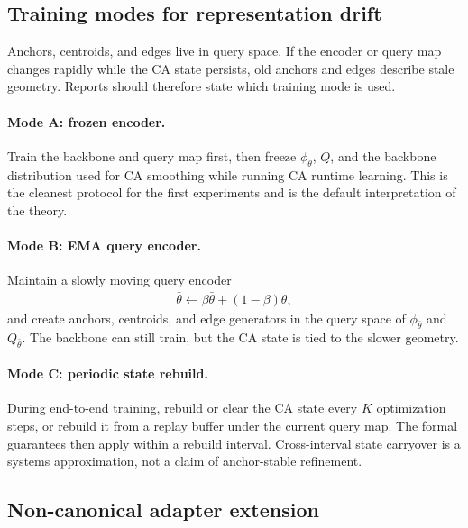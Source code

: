 \subsection{Training modes for representation drift}

Anchors, centroids, and edges live in query space. If the encoder or query map changes rapidly while the CA state persists, old anchors and edges describe stale geometry. Reports should therefore state which training mode is used.

\paragraph{Mode A: frozen encoder.}
Train the backbone and query map first, then freeze $\phi_\theta$, $Q$, and the backbone distribution used for CA smoothing while running CA runtime learning. This is the cleanest protocol for the first experiments and is the default interpretation of the theory.

\paragraph{Mode B: EMA query encoder.}
Maintain a slowly moving query encoder
\begin{align*}
\bar\theta\leftarrow \beta\bar\theta+(1-\beta)\theta,
\end{align*}
and create anchors, centroids, and edge generators in the query space of $\phi_{\bar\theta}$ and $Q_{\bar\theta}$. The backbone can still train, but the CA state is tied to the slower geometry.

\paragraph{Mode C: periodic state rebuild.}
During end-to-end training, rebuild or clear the CA state every $K$ optimization steps, or rebuild it from a replay buffer under the current query map. The formal guarantees then apply within a rebuild interval. Cross-interval state carryover is a systems approximation, not a claim of anchor-stable refinement.

\subsection{Non-canonical adapter extension}

